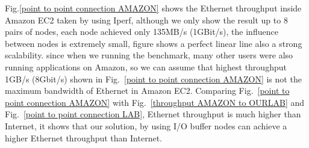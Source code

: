 



Fig.\ref{point to point connection AMAZON} shows the Ethernet throughput inside Amazon EC2 taken by using Iperf, although we only show the result up to 8 pairs of nodes, each node achieved only 135MB/s (1GBit/s), the influence between nodes is extremely small, figure shows a perfect linear line also a strong scalability.
since when we running the benchmark, many other users were also running applications on Amazon, so we can assume that highest throughput 1GB/s (8Gbit/s) shown in Fig.~\ref{point to point connection AMAZON} is not the maximum bandwidth of Ethernet in Amazon EC2.
Comparing Fig.~\ref{point to point connection AMAZON} with Fig.~\ref{throughput AMAZON to OURLAB} and Fig.~\ref{point to point connection LAB}, Ethernet throughput is much higher than Internet, it shows that our solution, by using I/O buffer nodes can achieve a higher Ethernet throughput than Internet.


